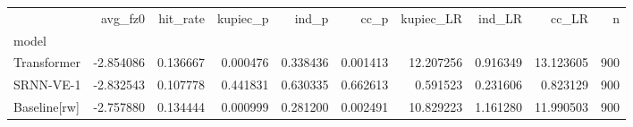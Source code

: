 \begin{tabular}{lrrrrrrrrr}
\toprule
 & avg_fz0 & hit_rate & kupiec_p & ind_p & cc_p & kupiec_LR & ind_LR & cc_LR & n \\
model &  &  &  &  &  &  &  &  &  \\
\midrule
Transformer & -2.854086 & 0.136667 & 0.000476 & 0.338436 & 0.001413 & 12.207256 & 0.916349 & 13.123605 & 900 \\
SRNN-VE-1 & -2.832543 & 0.107778 & 0.441831 & 0.630335 & 0.662613 & 0.591523 & 0.231606 & 0.823129 & 900 \\
Baseline[rw] & -2.757880 & 0.134444 & 0.000999 & 0.281200 & 0.002491 & 10.829223 & 1.161280 & 11.990503 & 900 \\
\bottomrule
\end{tabular}
